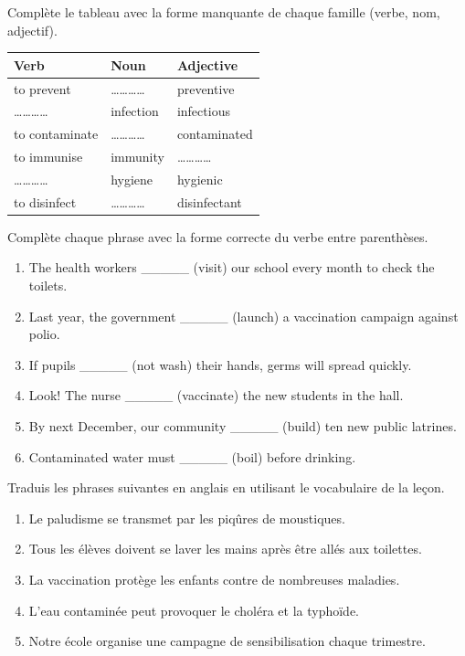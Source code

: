 \documentclass[11pt]{article}
\newcounter{popsec}
\newcounter{popsub}
\newcommand{\courssub}[1]{%
  \stepcounter{popsub}%
  \par\vspace{9pt}\noindent{\popxbold\fontsize{11.5}{13}\selectfont\color{popink}{\color{poporange}\thepopsec.\thepopsub}\hspace{6pt}#1}\par\nopagebreak\vspace{4pt}
}
\begin{document}
\begin{exercice}
Complète le tableau avec la forme manquante de chaque famille (verbe, nom, adjectif).
\begin{center}
\begin{tabular}{|l|l|l|}
\hline
\rowcolor{popblueL} \textbf{Verb} & \textbf{Noun} & \textbf{Adjective} \\
\hline
to prevent & \ldots\ldots\ldots\ldots & preventive \\
\hline
\ldots\ldots\ldots\ldots & infection & infectious \\
\hline
to contaminate & \ldots\ldots\ldots\ldots & contaminated \\
\hline
to immunise & immunity & \ldots\ldots\ldots\ldots \\
\hline
\ldots\ldots\ldots\ldots & hygiene & hygienic \\
\hline
to disinfect & \ldots\ldots\ldots\ldots & disinfectant \\
\hline
\end{tabular}
\end{center}
\end{exercice}

\begin{exercice}
Complète chaque phrase avec la forme correcte du verbe entre parenthèses.
\begin{enumerate}
\item The health workers \_\_\_\_\_ (visit) our school every month to check the toilets.
\item Last year, the government \_\_\_\_\_ (launch) a vaccination campaign against polio.
\item If pupils \_\_\_\_\_ (not wash) their hands, germs will spread quickly.
\item Look! The nurse \_\_\_\_\_ (vaccinate) the new students in the hall.
\item By next December, our community \_\_\_\_\_ (build) ten new public latrines.
\item Contaminated water must \_\_\_\_\_ (boil) before drinking.
\end{enumerate}
\end{exercice}

\courssub{Je m'entraîne}

\begin{exercice}[Traduction]
Traduis les phrases suivantes en anglais en utilisant le vocabulaire de la leçon.
\begin{enumerate}
\item Le paludisme se transmet par les piqûres de moustiques.
\item Tous les élèves doivent se laver les mains après être allés aux toilettes.
\item La vaccination protège les enfants contre de nombreuses maladies.
\item L'eau contaminée peut provoquer le choléra et la typhoïde.
\item Notre école organise une campagne de sensibilisation chaque trimestre.
\end{enumerate}
\end{exercice}
\end{document}
